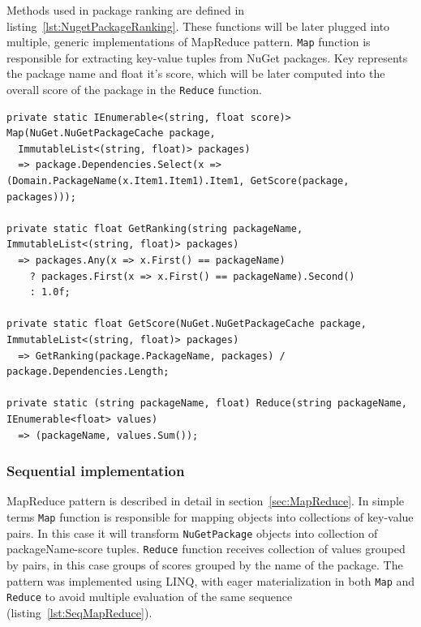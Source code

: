 Methods used in package ranking are defined in listing~\ref{lst:NugetPackageRanking}. These functions will be later plugged into multiple, generic implementations of MapReduce pattern. \texttt{Map} function is responsible for extracting key-value tuples from NuGet packages. Key represents the package name and float it's score, which will be later computed into the overall score of the package in the  \texttt{Reduce} function.

\begin{lstlisting}[language={[sharp]c}, style=sharpcstyle, caption={Nuget package ranking functions}, label={lst:NugetPackageRanking},
numbers=none, xleftmargin=0pt,framexleftmargin=0pt,framexrightmargin=0pt,framexbottommargin=0pt]
private static IEnumerable<(string, float score)> Map(NuGet.NuGetPackageCache package,
  ImmutableList<(string, float)> packages)
  => package.Dependencies.Select(x => (Domain.PackageName(x.Item1.Item1).Item1, GetScore(package, packages)));

private static float GetRanking(string packageName, ImmutableList<(string, float)> packages)
  => packages.Any(x => x.First() == packageName)
    ? packages.First(x => x.First() == packageName).Second()
    : 1.0f;

private static float GetScore(NuGet.NuGetPackageCache package, ImmutableList<(string, float)> packages)
  => GetRanking(package.PackageName, packages) / package.Dependencies.Length;

private static (string packageName, float) Reduce(string packageName, IEnumerable<float> values)
  => (packageName, values.Sum());
\end{lstlisting}

\subsubsection{Sequential implementation}
MapReduce pattern is described in detail in section~\ref{sec:MapReduce}. 
In simple terms \texttt{Map} function is responsible for mapping objects into collections of key-value pairs. In this case it will transform \texttt{NuGetPackage} objects into collection of packageName-score tuples.  \texttt{Reduce} function receives collection of values grouped by pairs, in this case groups of scores grouped by the name of the package. The pattern was implemented using LINQ, with eager materialization in both \texttt{Map} and  \texttt{Reduce} to avoid multiple evaluation of the same sequence (listing~\ref{lst:SeqMapReduce}).

